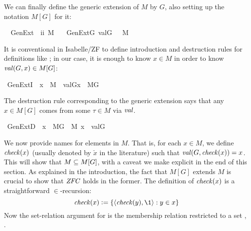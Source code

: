 We can finally define the generic extension of $M$ by $G$, also
setting up the notation $M[G]$ for it:
\begin{isabelle}
\isamarkupfalse%
\isanewline
\ \ GenExt\ {\isacharcolon}{\isacharcolon}\ {\isachardoublequoteopen}i{\isasymRightarrow}i{\isachardoublequoteclose}\ {\isacharparenleft}{\isachardoublequoteopen}M{\isacharbrackleft}{\isacharunderscore}{\isacharbrackright}{\isachardoublequoteclose}{\isacharparenright}\  \isanewline
\ \ {\isachardoublequoteopen}GenExt{\isacharparenleft}G{\isacharparenright}{\isacharequal}{\isacharequal}\ {\isacharbraceleft}val{\isacharparenleft}G{\isacharcomma}{\isasymtau}{\isacharparenright}{\isachardot}\ {\isasymtau}\ {\isasymin}\ M{\isacharbraceright}{\isachardoublequoteclose}
\end{isabelle}
It is conventional in Isabelle/ZF to define introduction and
destruction rules for definitions like ; in our case, it is
enough to know $x\in M$ in order to know $\operatorname{\mathit{val}}(G,x) \in M[G]$:
\begin{isabelle}
\isamarkupfalse%
\ GenExtI{\isacharcolon}\ \ {\isachardoublequoteopen}x\ {\isasymin}\ M\ {\isasymLongrightarrow}\ val{\isacharparenleft}G{\isacharcomma}x{\isacharparenright}\ {\isasymin}\ M{\isacharbrackleft}G{\isacharbrackright}{\isachardoublequoteclose}
\end{isabelle}
\noindent The destruction rule corresponding to the generic extension says
that any $x \in M[G]$ comes from some $\tau \in M$ via $\operatorname{\mathit{val}}$. 
\begin{isabelle}
\isamarkupfalse%
\ GenExtD{\isacharcolon}\ \ {\isachardoublequoteopen}x\ {\isasymin}\ M{\isacharbrackleft}G{\isacharbrackright}\ {\isasymLongrightarrow}\ {\isasymexists}{\isasymtau}{\isasymin}M{\isachardot}\ x\ {\isacharequal}\ val{\isacharparenleft}G{\isacharcomma}{\isasymtau}{\isacharparenright}{\isachardoublequoteclose}
\end{isabelle}


We now provide names for elements in $M$. That is, for each $x\in M$,
we define $\operatorname{\mathit{check}}(x)$ (usually denoted by $\check{x}$ in the literature)
such that $\operatorname{\mathit{val}}(G,\operatorname{\mathit{check}}(x))=x$. This will show that $M\subseteq M[G]$, with
a caveat we make explicit in the end of this section. As explained in
the introduction, the fact that $M[G]$ extends $M$ is crucial to show
that $\mathit{ZFC}$ holds in the former.
%
The definition of $\operatorname{\mathit{check}}(x)$ is a straightforward $\in$-recursion:
\begin{equation}
  \label{eq:def-check}
  \chk(x)\defi\{\lb\chk(y),\1\rb : y\in x\}
\end{equation}
Now the set-relation argument for  is the membership
relation restricted to a set , .

